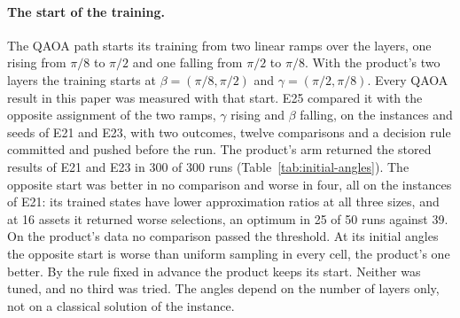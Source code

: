 \documentclass[11pt,a4paper]{article}
\begin{document}
\paragraph{The start of the training.} The QAOA path starts its training
from two linear ramps over the layers, one rising from $\pi/8$ to $\pi/2$
and one falling from $\pi/2$ to $\pi/8$. With the product's
two layers the training starts at $\beta = (\pi/8, \pi/2)$ and
$\gamma = (\pi/2, \pi/8)$. Every QAOA result in this paper was measured with
that start. E25 compared it with the opposite assignment of the two ramps,
$\gamma$ rising and $\beta$ falling, on the instances
and seeds of E21 and E23, with two outcomes, twelve comparisons and a
decision rule committed and pushed before the run. The product's arm returned
the stored results of E21 and E23 in 300 of 300 runs
(Table~\ref{tab:initial-angles}). The opposite start was better in no
comparison and worse in four, all on the instances of E21: its trained
states have lower approximation ratios at all three sizes, and at 16 assets
it returned worse selections, an optimum in 25 of 50 runs against 39. On the
product's data no comparison passed the threshold. At its initial angles the
opposite start is worse than uniform sampling in every cell, the product's
one better. By the rule fixed in advance the product keeps its start.
Neither was tuned, and no third was
tried. The angles depend on
the number of layers only, not on a classical solution of the instance.
\end{document}

